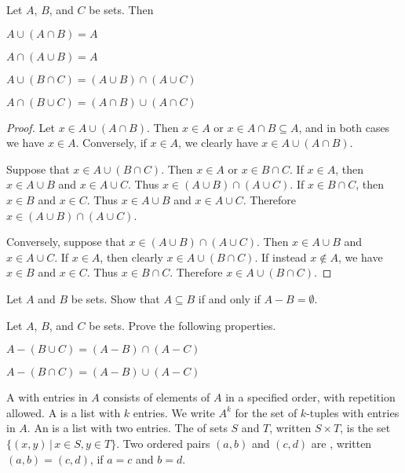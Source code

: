 \begin{prop}
Let $A$, $B$, and $C$ be sets.
Then
\begin{myEnum}
\item $A\cup(A\cap B) = A$\hfill{}
\item $A\cap(A\cup B) = A$\hfill{}
\item $A\cup(B\cap C) = (A\cup B)\cap (A\cup C)$\hfill{}
\item $A\cap(B\cup C) = (A\cap B)\cup (A\cap C)$\hfill{}
\end{myEnum}
\end{prop}
\begin{proof}
Let $x\in A\cup(A\cap B)$.
Then $x\in A$ or $x\in A\cap B\subseteq A$, and in both cases we have $x\in A$.
Conversely, if $x\in A$, we clearly have $x\in A\cup(A\cap B)$.

Suppose that $x\in A\cup(B\cap C)$.
Then $x\in A$ or $x\in B\cap C$.
If $x\in A$, then $x\in A\cup B$ and $x\in A\cup C$.
Thus $x\in (A\cup B)\cap(A\cup C)$.
If $x\in B\cap C$, then $x\in B$ and $x\in C$.
Thus $x\in A\cup B$ and $x\in A\cup C$.
Therefore $x\in (A\cup B)\cap(A\cup C)$.

Conversely, suppose that $x\in (A\cup B)\cap(A\cup C)$.
Then $x\in A\cup B$ and $x\in A\cup C$.
If $x\in A$, then clearly $x\in A\cup(B\cap C)$.
If instead $x\not\in A$, we have $x\in B$ and $x\in C$.
Thus $x\in B\cap C$.
Therefore $x\in A\cup(B\cap C)$.
\end{proof}


\begin{hw}
Let $A$ and $B$ be sets.
Show that $A\subseteq B$ if and only if $A-B=\emptyset$.
\end{hw}


\begin{hw}
Let $A$, $B$, and $C$ be sets.
Prove the following properties.
\begin{myEnum}
\item $A-(B\cup C) = (A-B)\cap(A-C)$\hfill{}
\item $A-(B\cap C) = (A-B)\cup(A-C)$\hfill{}
\end{myEnum}
\end{hw}


\begin{defn}
A  with entries in $A$ consists of elements of $A$ in a specified order,
with repetition allowed.
A  is a list with $k$ entries.
We write $A^k$ for the set of $k$-tuples with entries in $A$.
An  is a list with two entries.
The  of sets $S$ and $T$, written $S\times T$,
is the set $\{(x,y)\,|\, x\in S, y\in T\}$.
Two ordered pairs $(a,b)$ and $(c,d)$ are , written $(a,b)=(c,d)$,
if $a=c$ and $b=d$.
\end{defn}

